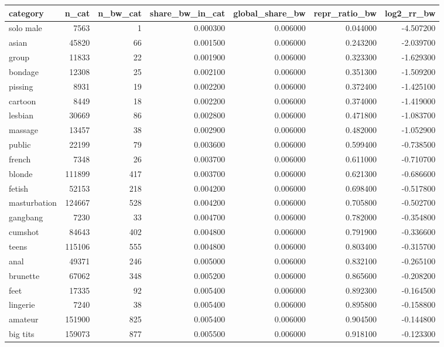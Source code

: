 \begin{tabular}{lrrrrrr}
\toprule
category & n_cat & n_bw_cat & share_bw_in_cat & global_share_bw & repr_ratio_bw & log2_rr_bw \\
\midrule
solo male & 7563 & 1 & 0.000300 & 0.006000 & 0.044000 & -4.507200 \\
asian & 45820 & 66 & 0.001500 & 0.006000 & 0.243200 & -2.039700 \\
group & 11833 & 22 & 0.001900 & 0.006000 & 0.323300 & -1.629300 \\
bondage & 12308 & 25 & 0.002100 & 0.006000 & 0.351300 & -1.509200 \\
pissing & 8931 & 19 & 0.002200 & 0.006000 & 0.372400 & -1.425100 \\
cartoon & 8449 & 18 & 0.002200 & 0.006000 & 0.374000 & -1.419000 \\
lesbian & 30669 & 86 & 0.002800 & 0.006000 & 0.471800 & -1.083700 \\
massage & 13457 & 38 & 0.002900 & 0.006000 & 0.482000 & -1.052900 \\
public & 22199 & 79 & 0.003600 & 0.006000 & 0.599400 & -0.738500 \\
french & 7348 & 26 & 0.003700 & 0.006000 & 0.611000 & -0.710700 \\
blonde & 111899 & 417 & 0.003700 & 0.006000 & 0.621300 & -0.686600 \\
fetish & 52153 & 218 & 0.004200 & 0.006000 & 0.698400 & -0.517800 \\
masturbation & 124667 & 528 & 0.004200 & 0.006000 & 0.705800 & -0.502700 \\
gangbang & 7230 & 33 & 0.004700 & 0.006000 & 0.782000 & -0.354800 \\
cumshot & 84643 & 402 & 0.004800 & 0.006000 & 0.791900 & -0.336600 \\
teens & 115106 & 555 & 0.004800 & 0.006000 & 0.803400 & -0.315700 \\
anal & 49371 & 246 & 0.005000 & 0.006000 & 0.832100 & -0.265100 \\
brunette & 67062 & 348 & 0.005200 & 0.006000 & 0.865600 & -0.208200 \\
feet & 17335 & 92 & 0.005400 & 0.006000 & 0.892300 & -0.164500 \\
lingerie & 7240 & 38 & 0.005400 & 0.006000 & 0.895800 & -0.158800 \\
amateur & 151900 & 825 & 0.005400 & 0.006000 & 0.904500 & -0.144800 \\
big tits & 159073 & 877 & 0.005500 & 0.006000 & 0.918100 & -0.123300 \\

\end{tabular}
